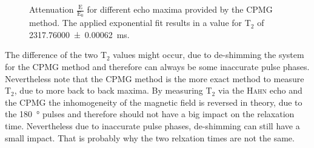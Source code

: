 \begin{figure}[H]
    \centering
    
    \caption[Attenuation $\frac{\text{E}}{\text{E}_0}$ for different echo maxima provided by the CPMG method.]{Attenuation $\frac{\text{E}}{\text{E}_0}$ for different echo maxima provided by the CPMG method. The applied exponential fit results in a value for T$_2$ of \SI{2317.76000 \pm 0.00062}{\milli \second}.}
    \label{fig:CPMG}
\end{figure}

The difference of the two T$_2$ values might occur, due to de-shimming the system for the CPMG method and therefore can always be some inaccurate pulse phases. Nevertheless note that the CPMG method is the more exact method to measure T$_2$, due to more back to back maxima. By measuring T$_2$ via the \textsc{Hahn} echo and the CPMG the inhomogeneity of the magnetic field is reversed in theory, due to the \SI{180}{\degree} pulses and therefore should not have a big impact on the relaxation time. Nevertheless due to inaccurate pulse phases, de-shimming can still have a small impact. That is probably why the two relxation times are not the same.